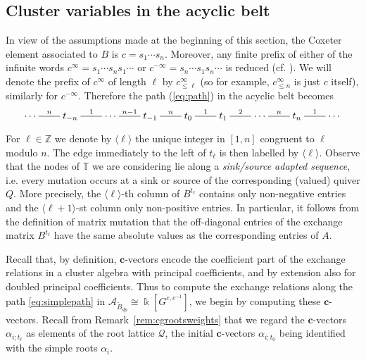 \documentclass[12pt]{amsart}
\newcommand{\cA}{\mathcal{A}}
\newcommand{\TT}{\mathbb{T}}
\newcommand{\ZZ}{\mathbb{Z}}
\newcommand{\kk}{\Bbbk}
\newcommand{\bfc}{\mathbf{c}}
\newcommand{\cv}{\alpha}
\newcommand{\cQ}{\mathcal{Q}}
\newcommand{\dashname}[1]{\stackrel{#1}{\begin{picture}(22,3)\put(0,2.5){\line(1,0){22}}\end{picture}}}
\renewcommand{\mod}[1]{\langle {#1} \rangle}
\newcommand{\Bdp}{\widetilde{B}_{dp}}
\newcommand{\Zidx}{\ell}
\theoremstyle{remark}
\numberwithin{equation}{section}
\numberwithin{figure}{section}
\begin{document}
\subsection{Cluster variables in the acyclic belt}
\label{sec:acyclic_belt}

In view of the assumptions made at the beginning of this section, the Coxeter element associated to $B$ is $c=s_1\cdots s_n$.  Moreover, any finite prefix of either of the infinite words $c^\infty =  s_1 \cdots s_n s_1 \cdots$ or $c^{-\infty} = s_n \cdots s_1 s_n \cdots$ is reduced (cf. \cite{Spe09}).
We will denote the prefix of $c^\infty$ of length $\Zidx$ by $c^\infty_{\le\Zidx}$ (so for example, $c^\infty_{\leq n}$ is just $c$ itself), similarly for $c^{-\infty}$.
Therefore the path (\ref{eq:path}) in the acyclic belt becomes
\begin{equation}
\label{eq:simplepath}
  \cdots
  \dashname{n}
  t_{-n}
  \dashname{1}
  \cdots
  \dashname{n-1}
  t_{-1}
  \dashname{n}
  t_0
  \dashname{1}
  t_1
  \dashname{2}
  \cdots
  \dashname{n}
  t_n
  \dashname{1}
  \cdots
\end{equation}

For $\Zidx\in\ZZ$ we denote by $\mod{\Zidx}$ the unique integer in $[1,n]$ congruent to $\Zidx$ modulo $n$.
The edge immediately to the left of $t_\Zidx$ is then labelled by $\mod{\Zidx}$.
Observe that the nodes of $\TT$ we are considering lie along a \emph{sink/source adapted sequence}, i.e. every mutation occurs at a sink or source of the corresponding (valued) quiver $Q$.
More precisely, the $\mod{\Zidx}$-th column of $B^{t_\Zidx}$ contains only non-negative entries and the $\mod{\Zidx+1}$-st column only non-positive entries.
In particular, it follows from the definition of matrix mutation that the off-diagonal entries of the exchange matrix $B^{t_\Zidx}$ have the same absolute values as the corresponding entries of $A$.

Recall that, by definition, $\bfc$-vectors encode the coefficient part of the exchange relations in a cluster algebra with principal coefficients, and by extension also for doubled principal coefficients. Thus to compute the exchange relations along the path \eqref{eq:simplepath} in $\cA_{\Bdp} \cong \kk[G^{c,c^{-1}}]$, we begin by computing these $\bfc$-vectors. 
Recall from Remark~\ref{rem:cgrootsweights} that we regard the $\bfc$-vectors $\cv_{i;t_\Zidx}$ as elements of the root lattice $\cQ$, the initial $\bfc$-vectors $\cv_{i;t_0}$ being identified with the simple roots $\alpha_i$.
\end{document}

